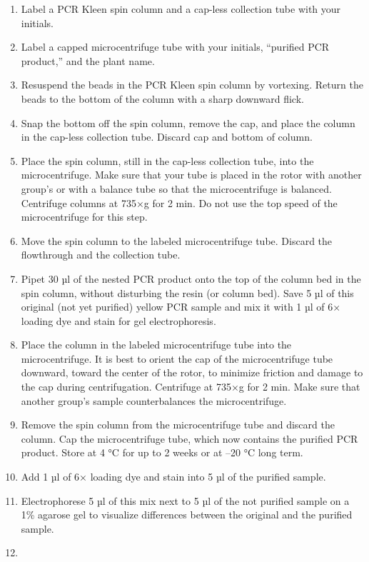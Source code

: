 \documentclass[]{book}
\providecommand{\tightlist}{%
  \setlength{\itemsep}{0pt}\setlength{\parskip}{0pt}}
\begin{document}
\begin{enumerate}
\def\labelenumi{\arabic{enumi}.}
\tightlist
\item
  Label a PCR Kleen spin column and a cap-less collection tube with your initials.
\item
  Label a capped microcentrifuge tube with your initials, ``purified PCR product,'' and the plant name.
\item
  Resuspend the beads in the PCR Kleen spin column
  by vortexing. Return the beads to the bottom of the column with a sharp downward flick.
\item
  Snap the bottom off the spin column, remove the cap, and place the column in the cap-less collection tube. Discard cap and bottom of column.
\item
  Place the spin column, still in the cap-less collection tube, into the microcentrifuge. Make sure that your tube is placed in the rotor with another group's or with a balance tube so that the microcentrifuge is balanced.
  Centrifuge columns at 735×g for 2 min. Do not use the top speed of the microcentrifuge for this step.
\item
  Move the spin column to the labeled microcentrifuge tube. Discard the flowthrough and the collection tube.
\item
  Pipet 30 µl of the nested PCR product onto the top of the column bed in the spin column, without disturbing the resin (or column bed).
  Save 5 µl of this original (not yet purified) yellow PCR sample and mix it with 1 µl of 6× loading dye and stain for gel electrophoresis.
\item
  Place the column in the labeled microcentrifuge tube into the microcentrifuge. It is best to orient the cap of the microcentrifuge tube downward, toward the center of the rotor, to minimize friction and damage to the cap during centrifugation.
  Centrifuge at 735×g for 2 min. Make sure that another group's sample counterbalances the microcentrifuge.
\item
  Remove the spin column from the microcentrifuge tube and discard the column. Cap the microcentrifuge tube, which now contains the purified PCR product. Store at 4 °C for up to 2 weeks or at --20 °C long term.
\item
  Add 1 µl of 6× loading dye and stain into 5 µl of the purified sample.
\item
  Electrophorese 5 µl of this mix next to 5 µl of the not purified sample on a 1\% agarose gel to visualize differences between the original and the purified sample.
\item

\end{enumerate}
\end{document}
